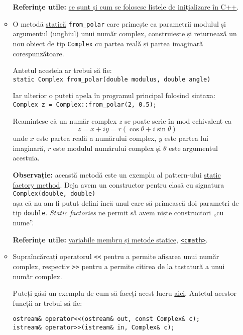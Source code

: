 \begin{enumerate}
\begin{itemize}
        \textbf{Referințe utile:} \href{https://www.educative.io/answers/what-are-initializer-lists-in-cpp}{ce sunt și cum se folosesc listele de inițializare în C++}.

        \item O metodă \href{https://en.cppreference.com/w/cpp/language/static}{statică} \texttt{from\_polar} care primește ca parametrii modulul și argumentul (unghiul) unui număr complex, construiește și returnează un nou obiect de tip \texttt{Complex} cu partea reală și partea imaginară corespunzătoare.

        Antetul acesteia ar trebui să fie: \\[0.5em]
        \texttt{static Complex from\_polar(double modulus, double angle)}

        Iar ulterior o puteți apela în programul principal folosind sintaxa: \\[0.5em]
        \texttt{Complex z = Complex::from\_polar(2, 0.5);}

        Reamintesc că un număr complex \(z\) se poate scrie în mod echivalent ca
        \[
            z = x + i y = r (\cos \theta + i \sin \theta)        
        \]
        unde \(x\) este partea reală a numărului complex, \(y\) este partea lui imaginară, \(r\) este modulul numărului complex și \(\theta\) este argumentul acestuia.

        \textbf{Observație:} această metodă este un exemplu al pattern-ului \href{https://stackify.com/static-factory-methods/}{static factory method}. Deja avem un constructor pentru clasă cu signatura \\[0.3em]
        \null \qquad \qquad \texttt{Complex(double, double)} \\[0.3em]
        așa că nu am fi putut defini încă unul care să primească doi parametri de tip \texttt{double}. \textit{Static factories} ne permit să avem niște constructori „cu nume”.

        \textbf{Referințe utile:} \href{https://www.tutorialspoint.com/cplusplus/cpp_static_members.htm}{variabile membru și metode statice}, \href{https://en.cppreference.com/w/cpp/header/cmath}{\texttt{<cmath>}}.

        \item Supraîncărcați operatorul \texttt{<<} pentru a permite afișarea unui număr complex, respectiv \texttt{>>} pentru a permite citirea de la tastatură a unui număr complex.

        Puteți găsi un exemplu de cum să faceți acest lucru \href{https://www.geeksforgeeks.org/overloading-stream-insertion-operators-c/}{aici}. Antetul acestor funcții ar trebui să fie:
        \begin{lstlisting}
ostream& operator<<(ostream& out, const Complex& c);
istream& operator>>(istream& in, Complex& c);
        \end{lstlisting}


\end{itemize}
\end{enumerate}
